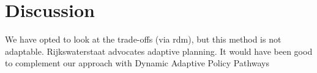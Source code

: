 \section{Discussion}
\label{s:discussion}




We have opted to look at the trade-offs (via rdm), but this method is not adaptable. Rijkswaterstaat advocates adaptive planning. It would have been good to complement our approach with Dynamic Adaptive Policy Pathways 